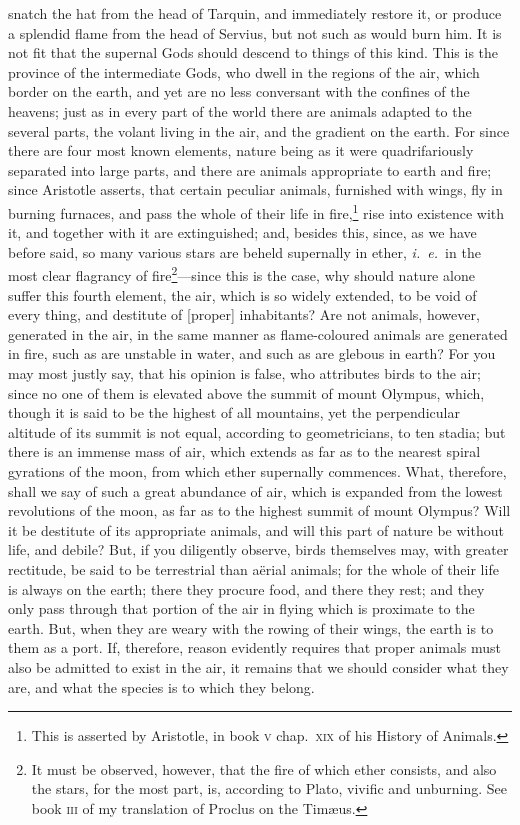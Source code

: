 \documentclass[12pt]{article}
\begin{document}
snatch the hat from the head of Tarquin, and immediately restore it, or produce
a splendid flame from the head of Servius, but not such as would burn him. It
is not fit that the supernal Gods should descend to things of this kind. This
is the province of the intermediate Gods, who dwell in the regions of the air,
which border on the earth, and yet are no less conversant with the confines of
the heavens; just as in every part of the world there are animals adapted to
the several parts, the volant living in the air, and the gradient on the earth.
For since there are four most known elements, nature being as it were
quadrifariously separated into large parts, and there are animals appropriate
to earth and fire; since Aristotle asserts, that certain peculiar animals,
furnished with wings, fly in burning furnaces, and pass the whole of their life
in fire,\footnote{This is asserted by Aristotle, in book \textsc{v}
chap.~\textsc{xix} of his History of Animals.} rise into existence with it, and
together with it are extinguished; and, besides this, since, as we have before
said, so many various stars are beheld supernally in ether, \textit{i.~e.}~in
the most clear flagrancy of fire\footnote{It must be observed, however, that
the fire of which ether consists, and also the stars, for the most part, is,
according to Plato, vivific and unburning. See book \textsc{iii} of my
translation of Proclus on the Tim{\ae}us.}---since this is the case, why should
nature alone suffer this fourth element, the air, which is so widely extended,
to be void of every thing, and destitute of [proper] inhabitants?  Are not
animals, however, generated in the air, in the same manner as flame-coloured
animals are generated in fire, such as are unstable in water, and such as are
glebous in earth? For you may most justly say, that his opinion is false, who
attributes birds to the air; since no one of them is elevated above the summit
of mount Olympus, which, though it is said to be the highest of all mountains,
yet the perpendicular altitude of its summit is not equal, according to
geometricians, to ten stadia; but there is an immense mass of air, which
extends as far as to the nearest spiral gyrations of the moon, from which ether
supernally commences. What, therefore, shall we say of such a great abundance
of air, which is expanded from the lowest revolutions of the moon, as far as to
the highest summit of mount Olympus? Will it be destitute of its appropriate
animals, and will this part of nature be without life, and debile? But, if you
diligently observe, birds themselves may, with greater rectitude, be said to be
terrestrial than a\"{e}rial animals; for the whole of their life is always on
the earth; there they procure food, and there they rest; and they only pass
through that portion of the air in flying which is proximate to the earth. But,
when they are weary with the rowing of their wings, the earth is to them as a
port. If, therefore, reason evidently requires that proper animals must also be
admitted to exist in the air, it remains that we should consider what they are,
and what the species is to which they belong.
\end{document}
